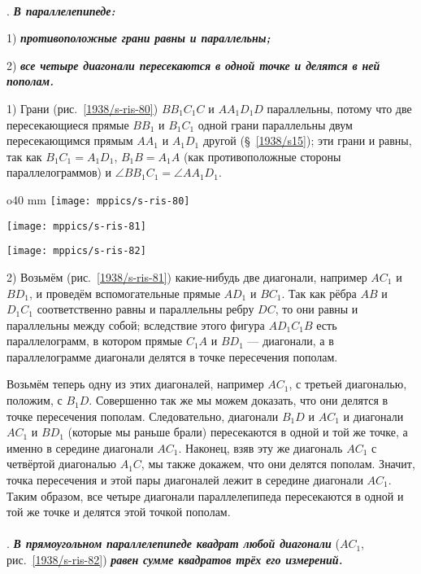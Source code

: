 \paragraph{}\label{1938/s72}
\mbox{.}
\textbf{\emph{В параллелепипеде:}}

1) \textbf{\emph{противоположные грани равны и параллельны;}}

2) \textbf{\emph{все четыре диагонали пересекаются в одной точке и делятся в ней пополам.}}

1) Грани (рис.~\ref{1938/s-ris-80}) $BB_1C_1C$ и $AA_1D_1D$ параллельны, потому что две пересекающиеся прямые $BB_1$ и $B_1C_1$ одной грани параллельны двум пересекающимся прямым $AA_1$ и $A_1D_1$ другой (§~\ref{1938/s15});
эти грани и равны, так как $B_1C_1=A_1D_1$, $B_1B=A_1A$ (как противоположные стороны параллелограммов) и $\angle BB_1C_1=\angle AA_1D_1$.

\begin{wrapfigure}[35]{o}{40 mm}
\vskip-0mm
\centering
\texttt{[image: mppics/s-ris-80]}
\caption{}\label{1938/s-ris-80}
\bigskip
\texttt{[image: mppics/s-ris-81]}
\caption{}\label{1938/s-ris-81}
\bigskip
\texttt{[image: mppics/s-ris-82]}
\caption{}\label{1938/s-ris-82}
\end{wrapfigure}

2) Возьмём (рис.~\ref{1938/s-ris-81}) какие-нибудь две диагонали, например $AC_1$ и $BD_1$, и проведём вспомогательные прямые $AD_1$ и $BC_1$.
Так как рёбра $AB$ и $D_1C_1$ соответственно равны и параллельны ребру $DC$, то они равны и параллельны между собой;
вследствие этого фигура $AD_1C_1B$ есть параллелограмм, в котором прямые $C_1A$ и $BD_1$ — диагонали, а в параллелограмме диагонали делятся в точке пересечения пополам.

Возьмём теперь одну из этих диагоналей, например $AC_1$, с третьей диагональю, положим, с $B_1D$.
Совершенно так же мы можем доказать, что они делятся в точке пересечения пополам.
Следовательно, диагонали $B_1D$ и $AC_1$ и диагонали $AC_1$ и $BD_1$ (которые мы раньше брали) пересекаются в одной и той же точке, а именно в середине диагонали $AC_1$.
Наконец, взяв эту же диагональ $AC_1$ с четвёртой диагональю $A_1C$, мы также докажем, что они делятся пополам.
Значит, точка пересечения и этой пары диагоналей лежит в середине диагонали $AC_1$.
Таким образом, все четыре диагонали параллелепипеда пересекаются в одной и той же точке и делятся этой точкой пополам.

\paragraph{}\label{1938/s73}
\mbox{.}
\textbf{\emph{В прямоугольном параллелепипеде квадрат любой диагонали}} ($AC_1$, рис.~\ref{1938/s-ris-82}) \textbf{\emph{равен сумме квадратов трёх его измерений.}}

